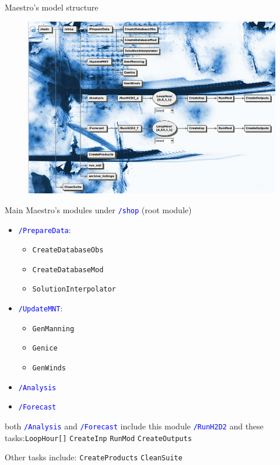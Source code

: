 \documentclass{beamer}
\begin{document}
\begin{frame}[allowframebreaks]{Maestro's model structure}
\begin{figure}
\includegraphics[scale=0.5]{800px-Flow.png}
\end{figure}

\framebreak

Main Maestro's modules under \texttt{\textcolor{blue}{/shop}} (root module)
\begin{itemize}
\item \texttt{\textcolor{blue}{/PrepareData}}:
\begin{itemize}
\item \texttt{CreateDatabaseObs}
\item \texttt{CreateDatabaseMod} 
\item \texttt{SolutionInterpolator} 
\end{itemize}
\item \texttt{\textcolor{blue}{/UpdateMNT}}: 
\begin{itemize}
\item \texttt{GenManning} 
\item \texttt{Genice}
\item \texttt{GenWinds} 
\end{itemize}

\item \texttt{\textcolor{blue}{/Analysis}} 
\item \texttt{\textcolor{blue}{/Forecast}} 
\end{itemize}
both \texttt{\textcolor{blue}{/Analysis}} and \texttt{\textcolor{blue}{/Forecast}} include this module \texttt{\textcolor{blue}{/RunH2D2}} and these tasks:\texttt{LoopHour[]} \texttt{CreateInp} \texttt{RunMod} \texttt{CreateOutputs}

Other tasks include: \texttt{CreateProducts} \texttt{CleanSuite}
\end{frame}
\end{document}
